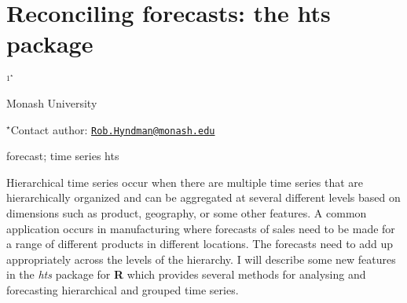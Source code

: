 \documentclass[\main/boa.tex]{subfiles}
\begin{document}
\section{Reconciling forecasts: the hts package}

\begin{center}
  {\bf {}$^{1^\star}$}
\end{center}

\vskip 0.3cm

\begin{affiliations}
\begin{enumerate}
\begin{minipage}{0.915\textwidth}
\centering
\item Monash University \\[-2pt]
\end{minipage}
\end{enumerate}
$^\star$Contact author: \href{mailto:Rob.Hyndman@monash.edu}{\nolinkurl{Rob.Hyndman@monash.edu}}\\
\end{affiliations}

\vskip 0.5cm

\begin{minipage}{0.915\textwidth}
\keywords forecast; time series
\packages hts
\end{minipage}

\vskip 0.8cm

Hierarchical time series occur when there are multiple time series that
are hierarchically organized and can be aggregated at several different
levels based on dimensions such as product, geography, or some other
features. A common application occurs in manufacturing where forecasts
of sales need to be made for a range of different products in different
locations. The forecasts need to add up appropriately across the levels
of the hierarchy. I will describe some new features in the \emph{hts}
package for \textbf{R} which provides several methods for analysing and
forecasting hierarchical and grouped time series.
\end{document}
